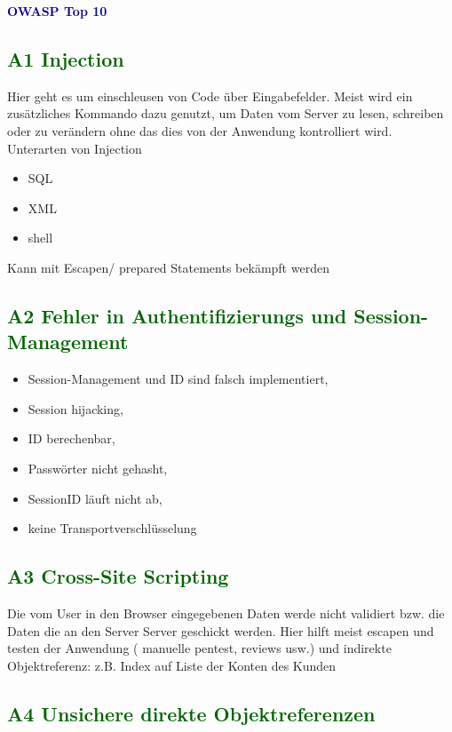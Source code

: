 \textbf{\textcolor{darkblue}{ OWASP Top 10}}~

\subsection*{\textcolor{darkgreen}{A1 Injection}}

Hier geht es um einschleusen von Code über Eingabefelder. Meist wird ein zusätzliches Kommando
dazu genutzt, um Daten vom Server zu lesen, schreiben oder zu verändern ohne das dies von
der Anwendung kontrolliert wird.
Unterarten von Injection
	\begin{itemize}
	\item SQL
	\item XML
	\item shell
	\end{itemize}
Kann mit Escapen/ prepared Statements bekämpft werden
\subsection*{\textcolor{darkgreen}{A2 Fehler in Authentifizierungs und Session-Management}}

	\begin{itemize}
	\item Session-Management und ID sind falsch implementiert,
	\item Session hijacking,
	\item ID berechenbar,
	\item Passwörter nicht gehasht,
	\item SessionID läuft nicht ab,
	\item keine Transportverschlüsselung
	\end{itemize}

\subsection*{\textcolor{darkgreen}{A3 Cross-Site Scripting}}

Die vom User in den Browser eingegebenen Daten werde nicht validiert bzw. die Daten die an den Server
Server geschickt werden. Hier hilft meist escapen und testen der Anwendung ( manuelle pentest, reviews usw.) und indirekte Objektreferenz: z.B. Index auf Liste der Konten des Kunden

\subsection*{\textcolor{darkgreen}{A4 Unsichere direkte Objektreferenzen}}


